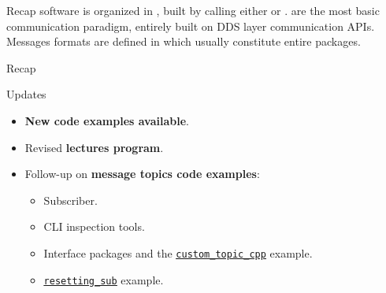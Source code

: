 
\begin{frame}{Recap}
 software is organized in , built by  calling either  or .
\newline\newline
{} are the most basic communication paradigm, entirely built on DDS layer communication APIs.
\newline\newline
Messages formats are defined in  which usually constitute entire packages.
\end{frame}
\begin{frame}{Recap}
  \begin{block}{Updates}
    \begin{itemize}
      \item \textbf{New code examples available}.
      \item Revised \textbf{lectures program}.
      \item Follow-up on \textbf{message topics code examples}:
      \begin{itemize}
        \item Subscriber.
        \item CLI inspection tools.
        \item Interface packages and the \href{https://github.com/IntelligentSystemsLabUTV/ros2-examples/tree/humble/src/cpp/custom_topic_cpp}{\color{blue}\underline{\texttt{custom\_topic\_cpp}}} example.
        \item \href{https://github.com/IntelligentSystemsLabUTV/ros2-examples/blob/humble/src/cpp/topic_pubsub_cpp/src/resetting_sub.cpp}{\color{blue}\underline{\texttt{resetting\_sub}}} example.
      \end{itemize}
    \end{itemize}
  \end{block}
\end{frame}

